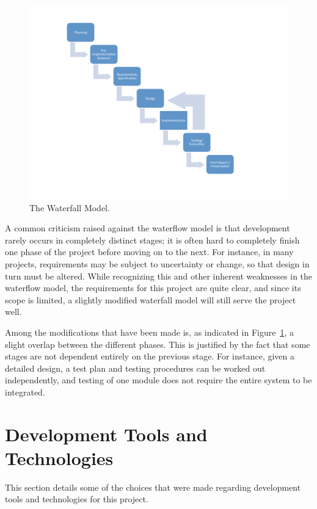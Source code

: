 \begin{figure}
  \begin{center}
    \includegraphics[width=\textwidth]{PrelimStudy/workflow}
    \caption{The Waterfall Model.}
    \label{workflow}
  \end{center}
\end{figure}

A common criticism raised against the waterflow model is that development rarely occurs in completely distinct stages; it is often hard to completely finish one phase of the project before moving on to the next. For instance, in many projects, requirements may be subject to uncertainty or change, so that design in turn must be altered. While recognizing this and other inherent weaknesses in the waterflow model, the requirements for this project are quite clear, and since its scope is limited, a slightly modified waterfall model will still serve the project well. 

Among the modifications that have been made is, as indicated in Figure~\ref{workflow}, a slight overlap between the different phases. This is justified by the fact that some stages are not dependent entirely on the previous stage. For instance, given a detailed design, a test plan and testing procedures can be worked out independently, and testing of one module does not require the entire system to be integrated.



\section{Development Tools and Technologies}\label{DevTools}
This section details some of the choices that were made regarding development tools and technologies for this project.

